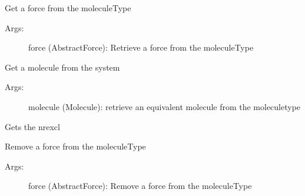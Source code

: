 \documentclass[letterpaper,10pt,english]{sphinxmanual}
\begin{document}
\begin{fulllineitems}

\begin{fulllineitems}
\label{moleculeType:ctools.MoleculeType.MoleculeType.getForce}
Get a force from the moleculeType
\begin{description}
\item[{Args:}] \leavevmode
force (AbstractForce): Retrieve a force from the moleculeType

\end{description}

\end{fulllineitems}



\begin{fulllineitems}
\label{moleculeType:ctools.MoleculeType.MoleculeType.getMolecule}
Get a molecule from the system
\begin{description}
\item[{Args:}] \leavevmode
molecule (Molecule): retrieve an equivalent molecule from the moleculetype

\end{description}

\end{fulllineitems}



\begin{fulllineitems}
\label{moleculeType:ctools.MoleculeType.MoleculeType.getNrexcl}
Gets the nrexcl

\end{fulllineitems}



\begin{fulllineitems}
\label{moleculeType:ctools.MoleculeType.MoleculeType.removeForce}
Remove a force from the moleculeType
\begin{description}
\item[{Args:}] \leavevmode
force (AbstractForce): Remove a force from the moleculeType

\end{description}


\end{fulllineitems}
\end{fulllineitems}
\end{document}

